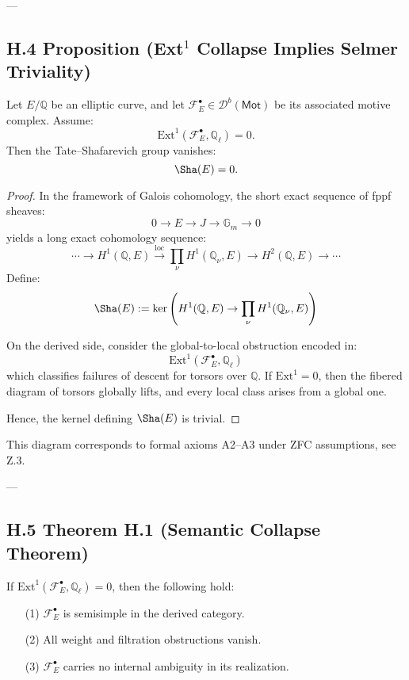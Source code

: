 ---

\subsection*{H.4 Proposition (Ext$^1$ Collapse Implies Selmer Triviality)}

\begin{proposition}
Let \( E/\mathbb{Q} \) be an elliptic curve, and let \( \mathcal{F}_E^\bullet \in \mathcal{D}^b(\mathsf{Mot}) \) be its associated motive complex.  
Assume:
\[
\mathrm{Ext}^1(\mathcal{F}_E^\bullet, \mathbb{Q}_\ell) = 0.
\]
Then the Tate–Shafarevich group vanishes:
\[
\Sha(E) = 0.
\]
\end{proposition}

\begin{proof}
In the framework of Galois cohomology, the short exact sequence of fppf sheaves:
\[
0 \to E \to J \to \mathbb{G}_m \to 0
\]
yields a long exact cohomology sequence:
\[
\cdots \to H^1(\mathbb{Q}, E) \xrightarrow{\mathrm{loc}} \prod_\nu H^1(\mathbb{Q}_\nu, E) \to H^2(\mathbb{Q}, E) \to \cdots
\]
Define:
\[
\Sha(E) := \ker \left( H^1(\mathbb{Q}, E) \to \prod_\nu H^1(\mathbb{Q}_\nu, E) \right)
\]

On the derived side, consider the global-to-local obstruction encoded in:
\[
\mathrm{Ext}^1(\mathcal{F}_E^\bullet, \mathbb{Q}_\ell)
\]
which classifies failures of descent for torsors over \( \mathbb{Q} \).  
If \( \mathrm{Ext}^1 = 0 \), then the fibered diagram of torsors globally lifts, and every local class arises from a global one.

Hence, the kernel defining \( \Sha(E) \) is trivial.
\end{proof}

\begin{remark}
This diagram corresponds to formal axioms A2–A3 under ZFC assumptions, see Z.3.
\end{remark}

---

\subsection*{H.5 Theorem H.1 (Semantic Collapse Theorem)}

\begin{theorem}
If \( \mathrm{Ext}^1(\mathcal{F}_E^\bullet, \mathbb{Q}_\ell) = 0 \), then the following hold:
\begin{itemize}
  \item[(1)] \( \mathcal{F}_E^\bullet \) is semisimple in the derived category.
  \item[(2)] All weight and filtration obstructions vanish.
  \item[(3)] \( \mathcal{F}_E^\bullet \) carries no internal ambiguity in its realization.
\end{itemize}
\end{theorem}

